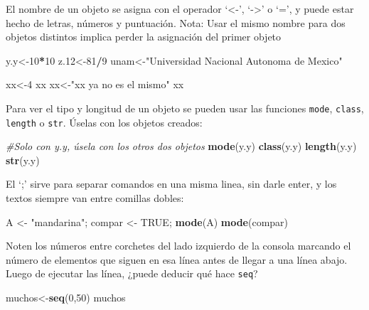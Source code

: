 \documentclass[]{article}
\newenvironment{Shaded}{\begin{snugshade}}{\end{snugshade}}
\newcommand{\CommentTok}[1]{\textcolor[rgb]{0.56,0.35,0.01}{\textit{#1}}}
\newcommand{\DecValTok}[1]{\textcolor[rgb]{0.00,0.00,0.81}{#1}}
\newcommand{\FloatTok}[1]{\textcolor[rgb]{0.00,0.00,0.81}{#1}}
\newcommand{\KeywordTok}[1]{\textcolor[rgb]{0.13,0.29,0.53}{\textbf{#1}}}
\newcommand{\NormalTok}[1]{#1}
\newcommand{\OperatorTok}[1]{\textcolor[rgb]{0.81,0.36,0.00}{\textbf{#1}}}
\newcommand{\OtherTok}[1]{\textcolor[rgb]{0.56,0.35,0.01}{#1}}
\newcommand{\StringTok}[1]{\textcolor[rgb]{0.31,0.60,0.02}{#1}}
\begin{document}
El nombre de un objeto se asigna con el operador `\textless-',
`-\textgreater{}' o `=', y puede estar hecho de letras, números y
puntuación. Nota: Usar el mismo nombre para dos objetos distintos
implica perder la asignación del primer objeto

\begin{Shaded}
\begin{Highlighting}[]
\NormalTok{y.y<-}\DecValTok{10}\OperatorTok{*}\DecValTok{10}
\NormalTok{z}\FloatTok{.12}\NormalTok{<-}\DecValTok{81}\OperatorTok{/}\DecValTok{9}
\NormalTok{unam<-}\StringTok{"Universidad Nacional Autonoma de Mexico"}

\NormalTok{xx<-}\DecValTok{4}
\NormalTok{xx}
\NormalTok{xx<-}\StringTok{"xx ya no es el mismo"}
\NormalTok{xx}
\end{Highlighting}
\end{Shaded}

Para ver el tipo y longitud de un objeto se pueden usar las funciones
\texttt{mode}, \texttt{class}, \texttt{length} o \texttt{str}. Úselas
con los objetos creados:

\begin{Shaded}
\begin{Highlighting}[]
\CommentTok{#Solo con y.y, úsela con los otros dos objetos}
\KeywordTok{mode}\NormalTok{(y.y)}
\KeywordTok{class}\NormalTok{(y.y)}
\KeywordTok{length}\NormalTok{(y.y)}
\KeywordTok{str}\NormalTok{(y.y)}
\end{Highlighting}
\end{Shaded}

El `;' sirve para separar comandos en una misma linea, sin darle enter,
y los textos siempre van entre comillas dobles:

\begin{Shaded}
\begin{Highlighting}[]
\NormalTok{A <-}\StringTok{ "mandarina"}\NormalTok{; compar <-}\StringTok{ }\OtherTok{TRUE}\NormalTok{; }\KeywordTok{mode}\NormalTok{(A)}
\KeywordTok{mode}\NormalTok{(compar)}
\end{Highlighting}
\end{Shaded}

Noten los números entre corchetes del lado izquierdo de la consola
marcando el número de elementos que siguen en esa línea antes de llegar
a una línea abajo. Luego de ejecutar las línea, ¿puede deducir qué hace
\texttt{seq}?

\begin{Shaded}
\begin{Highlighting}[]
\NormalTok{muchos<-}\KeywordTok{seq}\NormalTok{(}\DecValTok{0}\NormalTok{,}\DecValTok{50}\NormalTok{)}
\NormalTok{muchos}
\end{Highlighting}
\end{Shaded}
\end{document}

